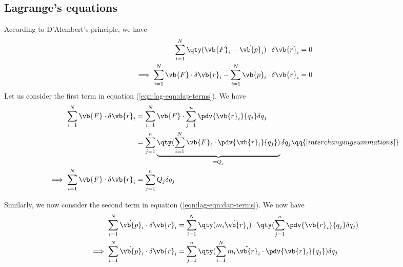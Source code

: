 \setcounter{equation}{0}
\subsection{Lagrange's equations}
According to D'Alembert's principle, we have
\begin{align}
	\sum_{i=1}^{N}{\qty(\vb{F}_i-\dot{\vb{p}}_i)\cdot\delta{\vb{r}_i}}&=0 \nonumber\\
	\implies\sum_{i=1}^{N}{\vb{F}\cdot\delta{\vb{r}_i}}-\sum_{i=1}^{N}{\dot{\vb{p}}_i\cdot\delta{\vb{r}_i}}&=0 \label{eqn:lag-eqn:dap-terms}
\end{align}
Let us consider the first term in equation (\ref{eqn:lag-eqn:dap-terms}). We have
\begin{align}
	\sum_{i=1}^{N}{\vb{F}\cdot\delta{\vb{r}_i}}&=\sum_{i=1}^{N}{\vb{F}\cdot\sum_{j=1}^{n}{\pdv{\vb{r}_i}{q_j}\delta{q_j}}} \nonumber\\
	&=\sum_{j=1}^{n}{\underbrace{\qty(\sum_{i=1}^{N}{\vb{F}_i\cdot\pdv{\vb{r}_i}{q_j}})}_{=Q_j}\delta{q_j}}\qq{[interchanging summations]} \nonumber\\
	\implies\sum_{i=1}^{N}{\vb{F}\cdot\delta{\vb{r}_i}}&=\sum_{j=1}^{n}{Q_j\delta{q_j}} \label{eqn:lag-eqn:dap-term-1}
\end{align}

Similarly, we now consider the second term in equation (\ref{eqn:lag-eqn:dap-terms}). We now have
\begin{align}
	\sum_{i=1}^{N}{\dot{\vb{p}}_i\cdot\delta{\vb{r}_i}}&=\sum_{i=1}^{N}{\qty(m_i\ddot{\vb{r}}_i)\cdot\qty(\sum_{j=1}^{n}{\pdv{\vb{r}_i}{q_j}\delta{q_j}})} \nonumber\\
	\implies\sum_{i=1}^{N}{\dot{\vb{p}}_i\cdot\delta{\vb{r}_i}}&=\sum_{j=1}^{n}{\qty(\sum_{i=1}^{N}{m_i\ddot{\vb{r}}_i}\cdot\pdv{\vb{r}_i}{q_j})\delta{q_j}} \label{eqn:lag-eqn:dap-term-2a}
\end{align}

